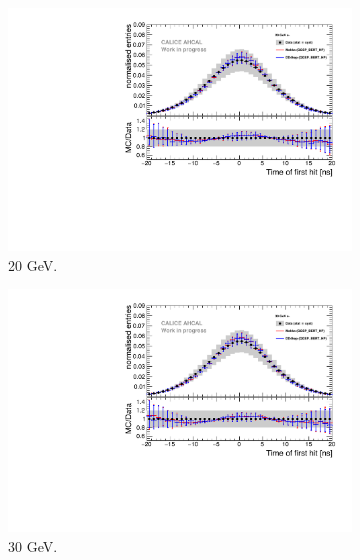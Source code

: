 \begin{figure}[htbp!]
\begin{subfigure}[t]{0.5\textwidth}
		\includegraphics[width=1\textwidth]{chap5/fig_AHCAL_timing/Electrons/Comparison_SimData_Electrons20GeV.pdf}
		\caption{20 GeV.}\label{fig:elec_sim_data_20GeV}
	\end{subfigure}
	\hfill
	\begin{subfigure}[t]{0.5\textwidth}
		\centering
		\includegraphics[width=1\textwidth]{chap5/fig_AHCAL_timing/Electrons/Comparison_SimData_Electrons30GeV.pdf}
		\caption{30 GeV.}\label{fig:elec_sim_data_30GeV}
	\end{subfigure}
	\hfill
	\begin{subfigure}[t]{0.5\textwidth}
		\centering

\end{subfigure}
\end{figure}
